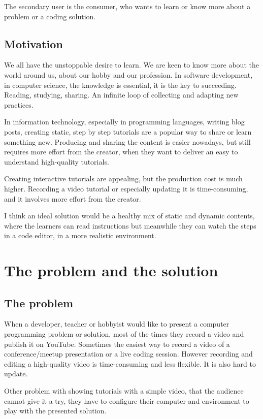 \documentclass[11pt, a4paper, twoside, openright]{report}
\begin{document}
The secondary user is the consumer, who wants to learn or know more about a problem or a coding solution.

\section{Motivation}

We all have the unstoppable desire to learn. We are keen to know more about the world around us, about our hobby and our profession. In software development, in computer science, the knowledge is essential, it is the key to succeeding. Reading, studying, sharing. An infinite loop of collecting and adapting new practices.

In information technology, especially in programming languages, writing blog posts, creating static, step by step tutorials are a popular way to share or learn something new. Producing and sharing the content is easier nowadays, but still requires more effort from the creator, when they want to deliver an easy to understand high-quality tutorials.

Creating interactive tutorials are appealing, but the production cost is much higher. Recording a video tutorial or especially updating it is time-consuming, and it involves more effort from the creator.

I think an ideal solution would be a healthy mix of static and dynamic contents, where the learners can read instructions but meanwhile they can watch the steps in a code editor, in a more realistic environment.

\chapter{The problem and the solution}

\section{The problem}

When a developer, teacher or hobbyist would like to present a computer programming problem or solution, most of the times they record a video and publish it on YouTube. Sometimes the easiest way to record a video of a conference/meetup presentation or a live coding session. However recording and editing a high-quality video is time-consuming and less flexible. It is also hard to update.

Other problem with showing tutorials with a simple video, that the audience cannot give it a try, they have to configure their computer and environment to play with the presented solution.
\end{document}
